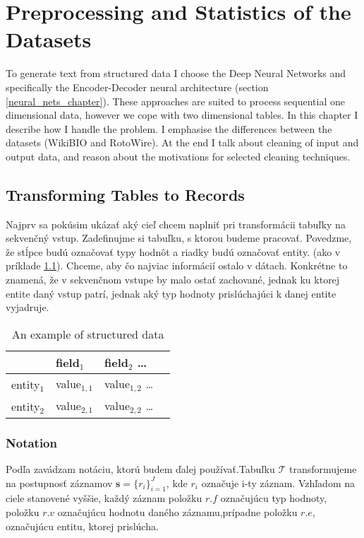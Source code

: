 \chapter{Preprocessing and Statistics of the Datasets} \label{chapPreproc}

To generate text from structured data I choose the Deep Neural Networks and specifically the Encoder-Decoder neural architecture (section \ref{neural_nets_chapter}). These ap\-\linebreak[4]proaches are suited to process sequential one dimensional data, however we cope with two dimensional tables. In this chapter I describe how I handle the problem. I emphasise the differences between the datasets (WikiBIO and RotoWire). At the end I talk about cleaning of input and output data, and reason about the motivations for selected cleaning techniques.

\section{Transforming Tables to Records} \label{table_to_record_trans}

Najprv sa pokúsim ukázať aký cieľ chcem naplniť pri transformácii tabuľky na sekvenčný vstup. Zadefinujme si tabuľku, s ktorou budeme pracovať. Povedzme, že stĺpce budú označovať typy hodnôt a riadky budú označovať entity. (ako v príklade \ref{ex_struct}). Chceme, aby čo najviac informácií ostalo v dátach. Konkrétne to znamená, že v sekvenčnom vstupe by malo ostať zachované, jednak ku ktorej entite daný vstup patrí, jednak aký typ hodnoty prislúchajúci k danej entite vyjadruje.

\begin{table}
    \centering
    \begin{tabular}{llll}
        \toprule
        {} & field$_1$ & field$_2$ \dots \\
        \midrule
        entity$_1$ & value$_{1,1}$ &  value$_{1,2}$ \dots \\
        entity$_2$ & value$_{2,1}$ & value$_{2,2}$ \dots
    \end{tabular}
    \caption{An example of structured data} \label{ex_struct}
\end{table}

\subsection{Notation}

Podľa \citep{liang-etal-2009-learning} zavádzam notáciu, ktorú budem ďalej používať.\linebreak[4]Tabuľku $\mathcal{T}$ transformujeme na postupnosť záznamov $ \mathbf{s} = \{ r_i \}_{i=1}^{J} $, kde $r_i$ označuje i-ty záznam. Vzhľadom na ciele stanovené vyššie, každý záznam položku $r.f$ označujúcu typ hodnoty, položku $r.v$ označujúcu hodnotu daného záznamu,\linebreak[4]prípadne položku $r.e$, označujúcu entitu, ktorej prislúcha.

